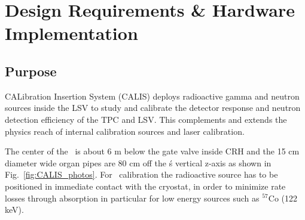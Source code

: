 \section{Design Requirements \& Hardware Implementation} \label{sec:hardware}\label{sec:design_requirements}

\subsection{Purpose}
CALibration Insertion System (CALIS) deploys radioactive gamma and neutron sources inside the LSV to study and calibrate the detector response and neutron detection efficiency of the TPC and LSV. This complements and extends the physics reach of internal calibration sources and laser calibration. 

The center of the \lsv\ is about 6 m below the gate valve inside CRH
 and the 15 cm diameter wide organ pipes are 80 cm off the \tpc\'s vertical z-axis as shown in Fig.~\ref{fig:CALIS_photos}. For \tpc\ calibration the radioactive source has to be positioned in immediate contact with the cryostat, in order to minimize rate losses through absorption in particular for low energy sources such as $^{57}$Co (122 keV). 

